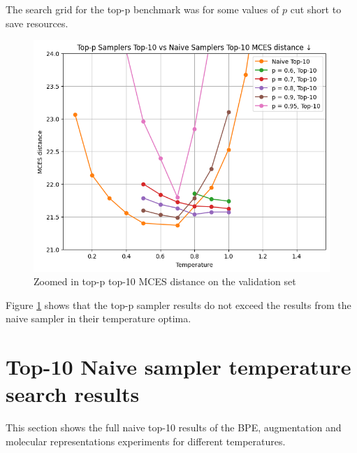The search grid for the top-p benchmark was for some values of $p$ cut short to save resources.

\begin{figure}[h]
    \centering
    \includegraphics[width=0.6\linewidth]{figures/appendix/samplers/top-p_vs_naive_top-10.png}
    \caption{Zoomed in top-p top-10 MCES distance on the validation set}
    \label{fig:top-p_zoomed_appendix}
\end{figure}

Figure \ref{fig:top-p_zoomed_appendix} shows that the top-p sampler results do not exceed the results from the naive sampler in their temperature optima.


\section{Top-10 Naive sampler temperature search results}
This section shows the full naive top-10 results of the \ac{BPE}, augmentation and molecular representations experiments for different temperatures.
\label{sec:temp_search_appendix}


